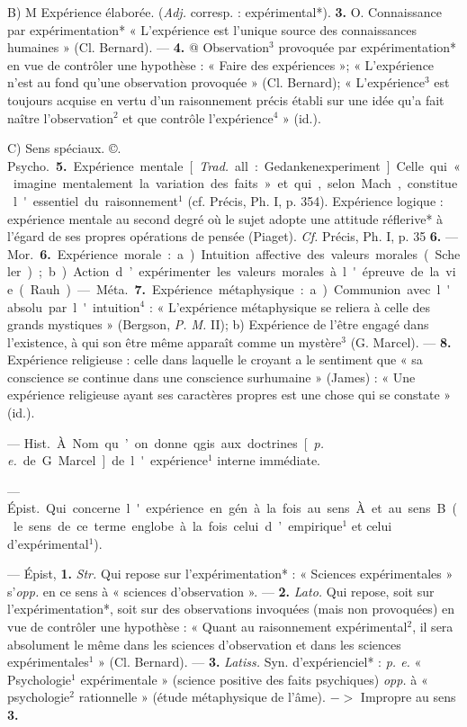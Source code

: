 \begin{itemize}[leftmargin=1cm, label=, itemsep=1pt]
B) M Expérience élaborée. ({\it Adj.}
corresp. : expérimental*). {\bf 3.} O. Connaissance par expérimentation*
« L'expérience est l'unique source
des connaissances humaines » (Cl.
Bernard). — {\bf 4.} @ Observation$^3$ provoquée par expérimentation* en
vue de contrôler une hypothèse :
« Faire des expériences »; « L’expérience n’est au fond qu’une observation provoquée » (Cl. Bernard);
« L'expérience$^3$ est toujours acquise
en vertu d'un raisonnement précis
établi sur une idée qu’a fait naître
l'observation$^2$ et que contrôle l’expérience$^4$ » (id.).

C) Sens spéciaux. ©. \si{Psycho.}
 {\bf 5.} Expérience mentale [{\it Trad.} all. :
Gedankenexperiment]. Celle qui
« imagine mentalement la variation
des faits » et qui, selon Mach, constitue l'essentiel du raisonnement$^1$
(cf. Précis, Ph. I, p. 354). Expérience logique : expérience mentale
au second degré où le sujet adopte
une attitude réflerive* à l'égard de
ses propres opérations de pensée
(Piaget). {\it Cf.} Précis, Ph. I, p. 35 {\bf 6.} —
\si{Mor.} {\bf 6.} Expérience morale : a) Intuition affective des valeurs morales
(Scheler); b) Action d’expérimenter
les valeurs morales à l'épreuve de
la vie (Rauh). — \si{Méta.} {\bf 7.} Expérience métaphysique : a) Communion
avec l'absolu par l'intuition$^4$ :
« L'expérience métaphysique se
reliera à celle des grands mystiques »
(Bergson, {\it P. M.} II); b) Expérience
de l’être engagé dans l'existence, à
qui son être même apparaît comme
un mystère$^3$ (G. Marcel). — {\bf 8.} Expérience religieuse : celle dans laquelle
le croyant a le sentiment que « sa
conscience se continue dans une
conscience surhumaine » (James) :
« Une expérience religieuse ayant ses
caractères propres est une chose
qui se constate » (id.).

 — \si{Hist.} À. Nom
qu’on donne qgis. aux doctrines
[{\it p. e.} de G. Marcel] de l'expérience$^1$
interne immédiate.

 — \si{Épist.}
Qui concerne l'expérience en gén. à
la fois au sens À et au sens B (le sens
de ce terme englobe à la fois celui
d’empirique$^1$ et celui d'expérimental$^1$).

 — Épist, {\bf 1.} {\it Str.} Qui
repose sur l’expérimentation* :
« Sciences expérimentales » s’{\it opp.}
en ce sens à « sciences d’observation ». — {\bf 2.} {\it Lato.} Qui repose, soit
sur l’expérimentation*, soit sur des
observations invoquées (mais non
provoquées) en vue de contrôler une
hypothèse : « Quant au raisonnement
expérimental$^2$, il sera absolument le même dans les sciences
d'observation et dans les sciences
expérimentales$^1$ » (Cl. Bernard). —
 {\bf 3.} {\it Latiss.} Syn. d'expérienciel* : {\it p. e.}
« Psychologie$^1$ expérimentale »
(science positive des faits psychiques) {\it opp.} à « psychologie$^2$ rationnelle » (étude métaphysique de
l'âme). $->$ Impropre au sens {\bf 3.}


\end{itemize}
